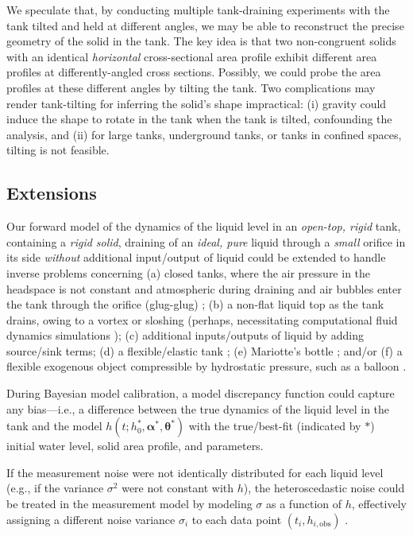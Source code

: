\documentclass[a4paper,fleqn]{cas-dc}
\begin{document}
We speculate that, by conducting multiple tank-draining experiments with the tank tilted and held at different angles, we may be able to reconstruct the precise geometry of the solid in the tank. The key idea is that two non-congruent solids with an identical \emph{horizontal} cross-sectional area profile exhibit different area profiles at differently-angled cross sections.
Possibly, we could probe the area profiles at these different angles by tilting the tank. 
Two complications may render tank-tilting for inferring the solid's shape impractical: 
(i) gravity could induce the shape to rotate in the tank when the tank is tilted, confounding the analysis, and (ii) for large tanks, underground tanks, or tanks in confined spaces, tilting is not feasible. 

\subsection{Extensions}
Our forward model of the dynamics of the liquid level in an \emph{open-top, rigid} tank, containing a \emph{rigid solid}, draining of an \emph{ideal, pure} liquid through a \emph{small} orifice in its side \emph{without} additional input/output of liquid could be extended to handle inverse problems concerning
(a) closed tanks, where the air pressure in the headspace is not constant and atmospheric during draining \cite{cross2016filling} and air bubbles enter the tank through the orifice (glug-glug) \cite{mayer2019bottle,clanet2004glug}; 
(b) a non-flat liquid top as the tank drains, owing to a vortex \cite{caquas2023bathtub} or sloshing \cite{ibrahim2005liquid} (perhaps, necessitating computational fluid dynamics simulations \cite{mathew2014numerical,sakri2017numerical});
(c) additional inputs/outputs of liquid by adding source/sink terms; 
(d) a flexible/elastic tank \cite{velankar2024soft};
(e) Mariotte's bottle \cite{kirevs2006mariotte}; and/or
(f) a flexible exogenous object compressible by hydrostatic pressure, such as a balloon \cite{muller2004rubber}. 

During Bayesian model calibration, a model discrepancy \cite{brynjarsdottir2014learning,kennedy2001bayesian,eugene2023learning} function could capture any bias---i.e., a difference between the true dynamics of the liquid level in the tank and the model $h(t; h_0^*,  \boldsymbol \alpha^*, \boldsymbol \theta^*)$ with the true/best-fit (indicated by $*$) initial water level, solid area profile, and parameters.

If the measurement noise were not identically distributed for each liquid level (e.g., if the variance $\sigma^2$ were not constant with $h$), the heteroscedastic noise could be treated in the measurement model by modeling $\sigma$ as a function of $h$, effectively assigning a different noise variance $\sigma_i$ to each data point $(t_i, h_{i, \text{obs}})$ \cite{minet2015bayesian,boscardin1994bayesian}. 
\end{document}
